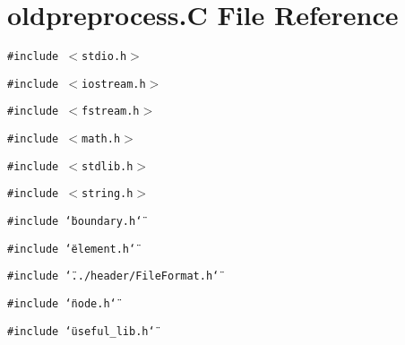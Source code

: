 \hypertarget{oldpreprocess_8C}{
\section{oldpreprocess.C File Reference}
\label{oldpreprocess_8C}
}
{\tt \#include $<$stdio.h$>$}\par
{\tt \#include $<$iostream.h$>$}\par
{\tt \#include $<$fstream.h$>$}\par
{\tt \#include $<$math.h$>$}\par
{\tt \#include $<$stdlib.h$>$}\par
{\tt \#include $<$string.h$>$}\par
{\tt \#include \char`\"{}boundary.h\char`\"{}}\par
{\tt \#include \char`\"{}element.h\char`\"{}}\par
{\tt \#include \char`\"{}../header/File\-Format.h\char`\"{}}\par
{\tt \#include \char`\"{}node.h\char`\"{}}\par
{\tt \#include \char`\"{}useful\_\-lib.h\char`\"{}}\par
